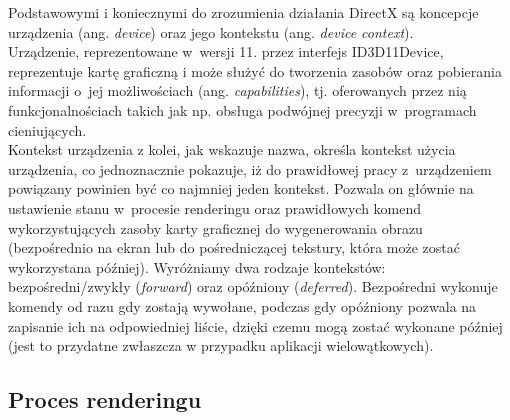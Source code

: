 Podstawowymi i koniecznymi do zrozumienia działania DirectX są koncepcje urządzenia (ang. \emph{device}) oraz jego kontekstu (ang. \emph{device context}).\\
Urządzenie, reprezentowane w~wersji 11. przez interfejs ID3D11Device, reprezentuje kartę graficzną i może służyć do tworzenia zasobów oraz pobierania informacji o~jej możliwościach (ang. \emph{capabilities}), tj. oferowanych przez nią funkcjonalnościach takich jak np. obsługa podwójnej precyzji w~programach cieniujących.\\
Kontekst urządzenia z kolei, jak wskazuje nazwa, określa kontekst użycia urządzenia, co jednoznacznie pokazuje, iż do prawidłowej pracy z~urządzeniem powiązany powinien być co najmniej jeden kontekst. Pozwala on głównie na ustawienie stanu w~procesie renderingu oraz prawidłowych komend wykorzystujących zasoby karty graficznej do wygenerowania obrazu (bezpośrednio na ekran lub do pośredniczącej tekstury, która może zostać wykorzystana później). Wyróżniamy dwa rodzaje kontekstów: bezpośredni/zwykły (\emph{forward}) oraz opóźniony (\emph{deferred}). Bezpośredni wykonuje komendy od razu gdy zostają wywołane, podczas gdy opóźniony pozwala na zapisanie ich na odpowiedniej liście, dzięki czemu mogą zostać wykonane później (jest to przydatne zwłaszcza w przypadku aplikacji wielowątkowych).\\

\subsection{Proces renderingu}


